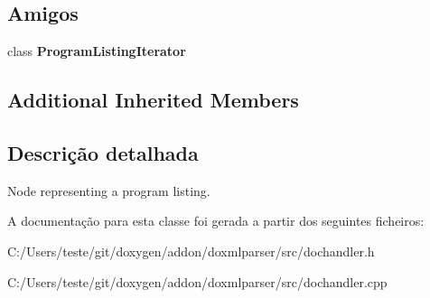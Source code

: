 \subsection*{Amigos}
\begin{DoxyCompactItemize}
\item 
\hypertarget{class_program_listing_handler_adfce73bc0c8b947eb07bee0086e3c2c3}{class {\bfseries Program\-Listing\-Iterator}}\label{class_program_listing_handler_adfce73bc0c8b947eb07bee0086e3c2c3}

\end{DoxyCompactItemize}
\subsection*{Additional Inherited Members}


\subsection{Descrição detalhada}
Node representing a program listing. 



A documentação para esta classe foi gerada a partir dos seguintes ficheiros\-:\begin{DoxyCompactItemize}
\item 
C\-:/\-Users/teste/git/doxygen/addon/doxmlparser/src/dochandler.\-h\item 
C\-:/\-Users/teste/git/doxygen/addon/doxmlparser/src/dochandler.\-cpp\end{DoxyCompactItemize}
